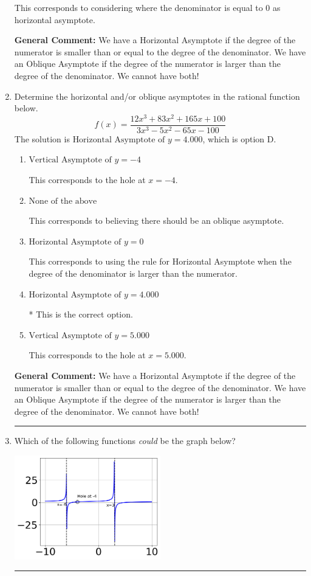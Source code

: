 \documentclass{extbook}[14pt]
\newcommand{\litem}[1]{\item #1

\rule{\textwidth}{0.4pt}}
\begin{document}
\begin{enumerate}
{\begin{enumerate}[label=\Alph*.]
This corresponds to considering where the denominator is equal to 0 as horizontal asymptote.
\end{enumerate}

\textbf{General Comment:} We have a Horizontal Asymptote if the degree of the numerator is smaller than or equal to the degree of the denominator. We have an Oblique Asymptote if the degree of the numerator is larger than the degree of the denominator. We cannot have both!
}
\litem{
Determine the horizontal and/or oblique asymptotes in the rational function below.
\[ f(x) = \frac{12x^{3} +83 x^{2} +165 x + 100}{3x^{3} -5 x^{2} -65 x -100} \]The solution is \( \text{Horizontal Asymptote of } y = 4.000  \), which is option D.\begin{enumerate}[label=\Alph*.]
\item \( \text{Vertical Asymptote of } y = -4  \)

This corresponds to the hole at $x = -4$.
\item \( \text{None of the above} \)

This corresponds to believing there should be an oblique asymptote.
\item \( \text{Horizontal Asymptote of } y = 0  \)

This corresponds to using the rule for Horizontal Asymptote when the degree of the denominator is larger than the numerator.
\item \( \text{Horizontal Asymptote of } y = 4.000  \)

* This is the correct option.
\item \( \text{Vertical Asymptote of } y = 5.000  \)

This corresponds to the hole at $x = 5.000$.
\end{enumerate}

\textbf{General Comment:} We have a Horizontal Asymptote if the degree of the numerator is smaller than or equal to the degree of the denominator. We have an Oblique Asymptote if the degree of the numerator is larger than the degree of the denominator. We cannot have both!
}
\litem{
Which of the following functions \textit{could} be the graph below?

\begin{center}
    \includegraphics[width=0.5\textwidth]{../Figures/identifyGraphOfRationalFunctionCopyC.png}
\end{center}


}
\end{enumerate}
\end{document}
